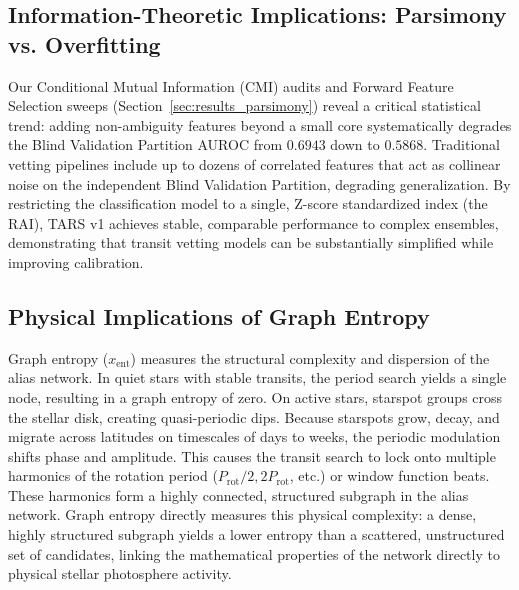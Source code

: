 \subsection{Information-Theoretic Implications: Parsimony vs. Overfitting} \label{sec:disc_parsimony}
Our Conditional Mutual Information (CMI) audits and Forward Feature Selection sweeps (Section~\ref{sec:results_parsimony}) reveal a critical statistical trend: adding non-ambiguity features beyond a small core systematically degrades the Blind Validation Partition AUROC from $0.6943$ down to $0.5868$. Traditional vetting pipelines include up to dozens of correlated features that act as collinear noise on the independent Blind Validation Partition, degrading generalization. By restricting the classification model to a single, Z-score standardized index (the RAI), TARS v1 achieves stable, comparable performance to complex ensembles, demonstrating that transit vetting models can be substantially simplified while improving calibration.

\subsection{Physical Implications of Graph Entropy} \label{sec:disc_entropy}
Graph entropy ($x_{\text{ent}}$) measures the structural complexity and dispersion of the alias network. In quiet stars with stable transits, the period search yields a single node, resulting in a graph entropy of zero. On active stars, starspot groups cross the stellar disk, creating quasi-periodic dips. Because starspots grow, decay, and migrate across latitudes on timescales of days to weeks, the periodic modulation shifts phase and amplitude. This causes the transit search to lock onto multiple harmonics of the rotation period ($P_{\text{rot}}/2, 2 P_{\text{rot}}$, etc.) or window function beats. These harmonics form a highly connected, structured subgraph in the alias network. Graph entropy directly measures this physical complexity: a dense, highly structured subgraph yields a lower entropy than a scattered, unstructured set of candidates, linking the mathematical properties of the network directly to physical stellar photosphere activity.

